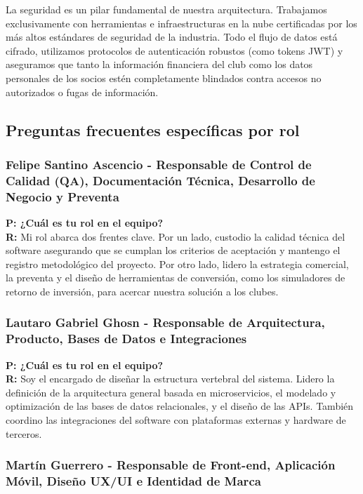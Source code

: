 La seguridad es un pilar fundamental de nuestra arquitectura. Trabajamos exclusivamente con herramientas e infraestructuras en la nube certificadas por los más altos estándares de seguridad de la industria. Todo el flujo de datos está cifrado, utilizamos protocolos de autenticación robustos (como tokens JWT) y aseguramos que tanto la información financiera del club como los datos personales de los socios estén completamente blindados contra accesos no autorizados o fugas de información.

\newpage

\subsection{Preguntas frecuentes específicas por rol}

\subsubsection{Felipe Santino Ascencio - Responsable de Control de Calidad (QA), Documentación Técnica, Desarrollo de Negocio y Preventa}

\textbf{P: ¿Cuál es tu rol en el equipo?} \\
\textbf{R:} Mi rol abarca dos frentes clave. Por un lado, custodio la calidad técnica del software asegurando que se cumplan los criterios de aceptación y mantengo el registro metodológico del proyecto. Por otro lado, lidero la estrategia comercial, la preventa y el diseño de herramientas de conversión, como los simuladores de retorno de inversión, para acercar nuestra solución a los clubes.

\subsubsection{Lautaro Gabriel Ghosn - Responsable de Arquitectura, Producto, Bases de Datos e Integraciones}

\textbf{P: ¿Cuál es tu rol en el equipo?} \\
\textbf{R:} Soy el encargado de diseñar la estructura vertebral del sistema. Lidero la definición de la arquitectura general basada en microservicios, el modelado y optimización de las bases de datos relacionales, y el diseño de las APIs. También coordino las integraciones del software con plataformas externas y hardware de terceros.

\subsubsection{Martín Guerrero - Responsable de Front-end, Aplicación Móvil, Diseño UX/UI e Identidad de Marca}

